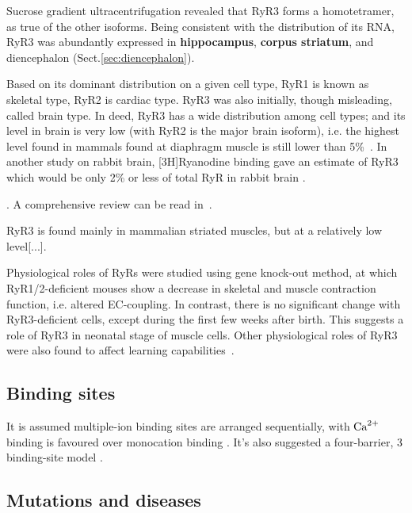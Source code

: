 Sucrose gradient ultracentrifugation revealed that RyR3 forms a homotetramer, as
true of the other isoforms. Being consistent with the distribution of its RNA,
RyR3 was abundantly expressed in {\bf hippocampus}, {\bf corpus striatum}, and
diencephalon (Sect.\ref{sec:diencephalon}).

Based on its dominant distribution on a given cell type, RyR1 is known as
skeletal type, RyR2 is cardiac type. RyR3 was also initially, though misleading,
called brain type.  In deed, RyR3 has a wide distribution among cell types; and
its level in brain is very low (with RyR2 is the major brain isoform), i.e.
the highest level found in mammals found at diaphragm muscle is still lower than
5\%~\citep{Murayama1997}. In another study on rabbit brain, [3H]Ryanodine
binding gave an estimate of RyR3 which would be only 2\% or less of total RyR in
rabbit brain \citep{Murayama1996}.

. A comprehensive review can be read
in~\citep{Zissimopoulos2007}. 

RyR3 is found mainly in mammalian striated muscles, but at a relatively low
level[...].


Physiological roles of RyRs were studied using gene knock-out method, at which
RyR1/2-deficient mouses show a decrease in skeletal and muscle contraction
function, i.e. altered EC-coupling. In contrast, there is no significant change
with RyR3-deficient cells, except during the first few weeks after birth. This
suggests a role of RyR3 in neonatal stage of muscle cells. Other
physiological roles of RyR3 were also found to affect learning
capabilities~\citep{Futatsugi1999}.





\subsection{Binding sites}

It is assumed multiple-ion binding sites are arranged sequentially, with ${\text{Ca}^{2+}}$
binding is favoured over monocation binding \citep{zucchi1997}. It's also
suggested a four-barrier, 3 binding-site model \citep{Tinker1992}.

\subsection{Mutations and diseases}

